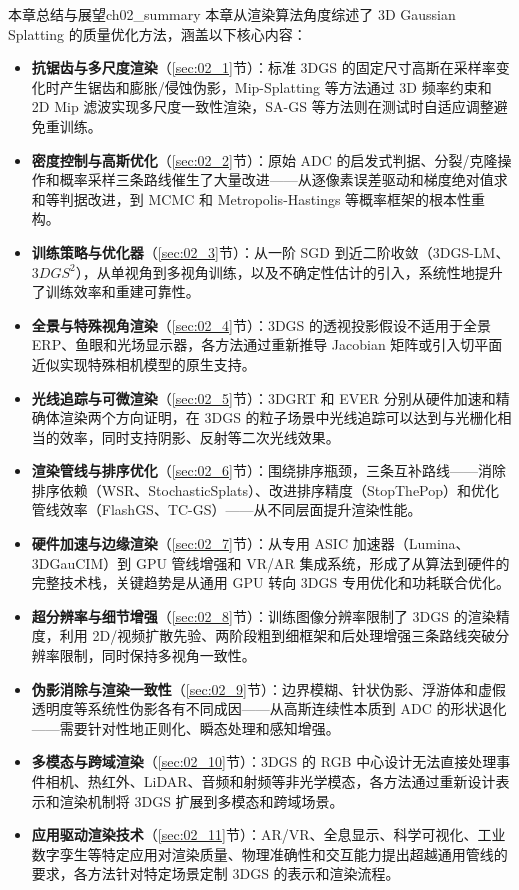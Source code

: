 \begin{futurebox}{本章总结与展望}{ch02_summary}
本章从渲染算法角度综述了 3D Gaussian Splatting 的质量优化方法，涵盖以下核心内容：
\begin{itemize}
\item \textbf{抗锯齿与多尺度渲染}（\ref{sec:02_1}节）：标准 3DGS 的固定尺寸高斯在采样率变化时产生锯齿和膨胀/侵蚀伪影，Mip-Splatting 等方法通过 3D 频率约束和 2D Mip 滤波实现多尺度一致性渲染，SA-GS 等方法则在测试时自适应调整避免重训练。
\item \textbf{密度控制与高斯优化}（\ref{sec:02_2}节）：原始 ADC 的启发式判据、分裂/克隆操作和概率采样三条路线催生了大量改进——从逐像素误差驱动和梯度绝对值求和等判据改进，到 MCMC 和 Metropolis-Hastings 等概率框架的根本性重构。
\item \textbf{训练策略与优化器}（\ref{sec:02_3}节）：从一阶 SGD 到近二阶收敛（3DGS-LM、$3DGS^2$），从单视角到多视角训练，以及不确定性估计的引入，系统性地提升了训练效率和重建可靠性。
\item \textbf{全景与特殊视角渲染}（\ref{sec:02_4}节）：3DGS 的透视投影假设不适用于全景 ERP、鱼眼和光场显示器，各方法通过重新推导 Jacobian 矩阵或引入切平面近似实现特殊相机模型的原生支持。
\item \textbf{光线追踪与可微渲染}（\ref{sec:02_5}节）：3DGRT 和 EVER 分别从硬件加速和精确体渲染两个方向证明，在 3DGS 的粒子场景中光线追踪可以达到与光栅化相当的效率，同时支持阴影、反射等二次光线效果。
\item \textbf{渲染管线与排序优化}（\ref{sec:02_6}节）：围绕排序瓶颈，三条互补路线——消除排序依赖（WSR、StochasticSplats）、改进排序精度（StopThePop）和优化管线效率（FlashGS、TC-GS）——从不同层面提升渲染性能。
\item \textbf{硬件加速与边缘渲染}（\ref{sec:02_7}节）：从专用 ASIC 加速器（Lumina、3DGauCIM）到 GPU 管线增强和 VR/AR 集成系统，形成了从算法到硬件的完整技术栈，关键趋势是从通用 GPU 转向 3DGS 专用优化和功耗联合优化。
\item \textbf{超分辨率与细节增强}（\ref{sec:02_8}节）：训练图像分辨率限制了 3DGS 的渲染精度，利用 2D/视频扩散先验、两阶段粗到细框架和后处理增强三条路线突破分辨率限制，同时保持多视角一致性。
\item \textbf{伪影消除与渲染一致性}（\ref{sec:02_9}节）：边界模糊、针状伪影、浮游体和虚假透明度等系统性伪影各有不同成因——从高斯连续性本质到 ADC 的形状退化——需要针对性地正则化、瞬态处理和感知增强。
\item \textbf{多模态与跨域渲染}（\ref{sec:02_10}节）：3DGS 的 RGB 中心设计无法直接处理事件相机、热红外、LiDAR、音频和射频等非光学模态，各方法通过重新设计表示和渲染机制将 3DGS 扩展到多模态和跨域场景。
\item \textbf{应用驱动渲染技术}（\ref{sec:02_11}节）：AR/VR、全息显示、科学可视化、工业数字孪生等特定应用对渲染质量、物理准确性和交互能力提出超越通用管线的要求，各方法针对特定场景定制 3DGS 的表示和渲染流程。
\end{itemize}


\end{futurebox}
